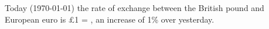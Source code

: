 \documentclass{article}
\begin{document}
Today (\today) the rate of exchange between the British pound
and European euro is \pounds 1 = , an increase of 1\%
over yesterday.
\end{document}
